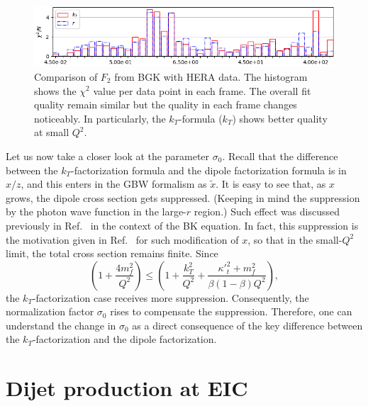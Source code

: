 \documentclass[11pt]{article}
\begin{document}
\begin{figure}[p]
\includegraphics[width=\textwidth]{./plots/Figure_2-3.png}
\caption{Comparison of $F_2$ from BGK with HERA data. The histogram shows the
$\chi^2$ value per data point in each frame. The overall fit quality
remain similar but the quality in each frame changes noticeably. In
particularly, the $k_T$-formula ($k_T$) shows better quality at small $Q^2$.}
\label{fig:BGK-Grid}
\end{figure}

Let us now take a closer look at the parameter $\sigma_0$. Recall that the
difference between the $k_T$-factorization formula and the dipole factorization
formula is in $x/z$, and this enters in the GBW formalism as
$\tilde{x}$. It is easy to see that, as $x$ grows, the dipole cross section gets
suppressed. (Keeping in mind the suppression by the photon wave function in the
large-$r$ region.) Such effect was discussed previously in
Ref.~\cite{Kutak:2004ym} in the context of the BK equation. In fact, this
suppression is the motivation given in Ref.~\cite{Golec-Biernat:1998zce} for
such modification of $x$, so that in the small-$Q^2$ limit, the total cross
section remains finite. Since 
%
\begin{equation}
\left(1+\frac{4 m_f^2}{Q^2}\right)\leq\left(1+\frac{k_T^2}{Q^2}+\frac{{\kappa'}_t^2+m_f^2}{\beta(1-\beta)Q^2}\right),
\end{equation}
%
the $k_T$-factorization case receives more suppression. Consequently, the
normalization factor $\sigma_0$ rises to compensate the suppression.  Therefore,
one can understand the change in $\sigma_0$ as a direct consequence of the key
difference between the $k_T$-factorization and the dipole factorization.

\section{Dijet production at EIC}
\label{sec:dijetsEIC}
\end{document}
